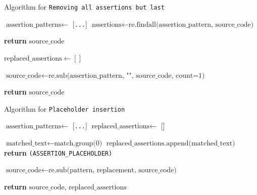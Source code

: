     \begin{algorithm}[H]
    \caption{Algorithm for \texttt{Removing all assertions but last}}
    \label{algorithm_remove_assertion}
    \begin{algorithmic}[1]
        \State $\text{assertion\_patterns} \gets$ [\texttt{...}] 
        \State $\text{assertions} \gets \text{re.findall(assertion\_pattern, source\_code)}$
    
            \State \textbf{return} $\text{source\_code}$
        \EndIf
    
        \State $\text{replaced\_assertions} \gets []$
    
            \State $\text{source\_code} \gets \text{re.sub(assertion\_pattern, "", source\_code, count=1)}$
        \EndFor
    
        \State \textbf{return} $\text{source\_code}$
    \EndFunction
    \end{algorithmic}
    \end{algorithm}

    \begin{algorithm}
    \caption{Algorithm for \texttt{Placeholder insertion}}
    \label{algorithm_placeholder_insertion}
    \begin{algorithmic}[1]
        \State $\text{assertion\_patterns} \gets$ [\texttt{...}] 
        \State $\text{replaced\_assertions} \gets$ [] 
    
                \State $\text{matched\_text} \gets \text{match.group(0)}$
                \State $\text{replaced\_assertions.append(matched\_text)}$
                \State \textbf{return} \texttt{(ASSERTION\_PLACEHOLDER)}
            \EndFunction
    
            \State $\text{source\_code} \gets \text{re.sub(pattern, replacement, source\_code)}$
        \EndFor
    
        \State \textbf{return} $\text{source\_code, replaced\_assertions}$
    \EndFunction
    \end{algorithmic}
    \end{algorithm}
        
